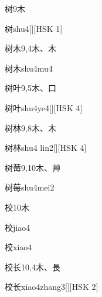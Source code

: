 \begin{Entry}{树}{9}{⽊}
  \begin{Phonetics}{树}{shu4}[][HSK 1]
  \end{Phonetics}
\end{Entry}

\begin{Entry}{树木}{9,4}{⽊、⽊}
  \begin{Phonetics}{树木}{shu4mu4}
  \end{Phonetics}
\end{Entry}

\begin{Entry}{树叶}{9,5}{⽊、⼝}
  \begin{Phonetics}{树叶}{shu4ye4}[][HSK 4]
  \end{Phonetics}
\end{Entry}

\begin{Entry}{树林}{9,8}{⽊、⽊}
  \begin{Phonetics}{树林}{shu4 lin2}[][HSK 4]
  \end{Phonetics}
\end{Entry}

\begin{Entry}{树莓}{9,10}{⽊、⾋}
  \begin{Phonetics}{树莓}{shu4mei2}
  \end{Phonetics}
\end{Entry}

\begin{Entry}{校}{10}{⽊}
  \begin{Phonetics}{校}{jiao4}
  \end{Phonetics}
  \begin{Phonetics}{校}{xiao4}
  \end{Phonetics}
\end{Entry}

\begin{Entry}{校长}{10,4}{⽊、⾧}
  \begin{Phonetics}{校长}{xiao4zhang3}[][HSK 2]
  \end{Phonetics}
\end{Entry}

